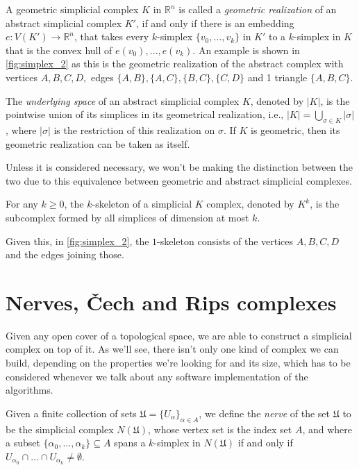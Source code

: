 A geometric simplicial complex $K$ in $\mathbb{R}^{n}$ is called a \textit{geometric realization} of an abstract simplicial complex $K'$, if and only if there is an embedding $e: V(K') \to \mathbb{R}^{n}$, that takes every $k$-simplex $\{v_{0}, \ldots, v_{k}\}$ in $K'$ to a $k$-simplex in $K$ that is the convex hull of $e(v_{0}), \ldots, e(v_{k})$. An example is shown in \ref{fig:simplex_2} as this is the geometric realization of the abstract complex with vertices $A,B,C,D,$ edges $\{A,B\}, \{A,C\}, \{B,C\}, \{C,D\}$ and 1 triangle $\{A,B,C\}$.

\begin{definition}
  The \textit{underlying space} of an abstract simplicial complex $K$, denoted by $|K|$, is the pointwise union of its simplices in its geometrical realization, i.e., $|K| = \bigcup_{\sigma \in K}|\sigma|$, where $|\sigma|$ is the restriction of this realization on $\sigma$. If $K$ is geometric, then its geometric realization can be taken as itself.
\end{definition}

Unless it is considered necessary, we won't be making the distinction between the two due to this equivalence between geometric and abstract simplicial complexes.

\begin{definition}[$k$-skeleton]
  For any $k \geq 0$, the $k$-skeleton of a simplicial $K$ complex, denoted by $K^{k}$, is the subcomplex formed by all simplices of dimension at most $k$.
\end{definition}
Given this, in \ref{fig:simplex_2}, the $1$-skeleton consists of the vertices $A,B,C,D$ and the edges joining those.

\section{Nerves, Čech and Rips complexes}
Given any open cover of a topological space, we are able to construct a simplicial complex on top of it. As we'll see, there isn't only one kind of complex we can build, depending on the properties we're looking for and its size, which has to be considered whenever we talk about any software implementation of the algorithms.

\begin{definition}[Nerve]
  Given a finite collection of sets $\mathfrak{U} = \{U_{\alpha}\}_{\alpha \in A}$, we define the \textit{nerve} of the set $\mathfrak{U}$ to be the simplicial complex $N(\mathfrak{U})$, whose vertex set is the index set $A$, and where a subset $\{\alpha_{0}, \ldots, \alpha_{k}\} \subseteq A$ spans a $k$-simplex in $N(\mathfrak{U})$ if and only if $U_{\alpha_{0}} \cap \ldots \cap U_{\alpha_{k}} \ne \emptyset$.
\end{definition}

